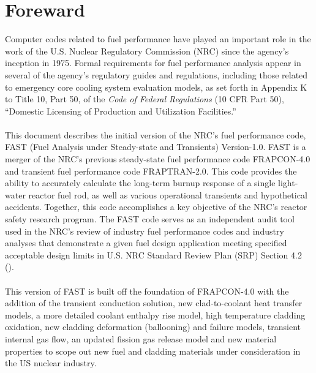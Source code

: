 \chapter*{Foreward}
\noindent
Computer codes related to fuel performance have played an important role in the work of the U.S.
Nuclear Regulatory Commission (NRC) since the agency's inception in 1975. Formal requirements for
fuel performance analysis appear in several of the agency's regulatory guides and regulations,
including those related to emergency core cooling system evaluation models, as set forth in Appendix
K to Title 10, Part 50, of the \emph{Code of Federal Regulations} (10 CFR Part 50), ``Domestic
Licensing of Production and Utilization Facilities.''
\\
\\
\noindent
This document describes the initial version of the NRC's fuel performance code, FAST (Fuel Analysis
under Steady-state and Transients) Version-1.0.  FAST is a merger of the NRC's previous steady-state
fuel performance code FRAPCON-4.0 and transient fuel performance code FRAPTRAN-2.0. This code
provides the ability to accurately calculate the long-term burnup response of a single light-water
reactor fuel rod, as well as various operational transients and hypothetical accidents.  Together,
this code accomplishes a key objective of the NRC's reactor safety research program. The FAST code
serves as an independent audit tool used in the NRC's review of industry fuel performance codes and
industry analyses that demonstrate a given fuel design application meeting specified acceptable
design limits in U.S. NRC Standard Review Plan (SRP) Section 4.2 (\cite{ref:USNRC2007}).
\\
\\
This version of FAST is built off the foundation of FRAPCON-4.0 with the addition of the transient
conduction solution, new clad-to-coolant heat transfer models, a more detailed coolant enthalpy rise
model, high temperature cladding oxidation, new cladding deformation (ballooning) and failure
models, transient internal gas flow, an updated fission gas release model and new material
properties to scope out new fuel and cladding materials under consideration in the US nuclear
industry.
